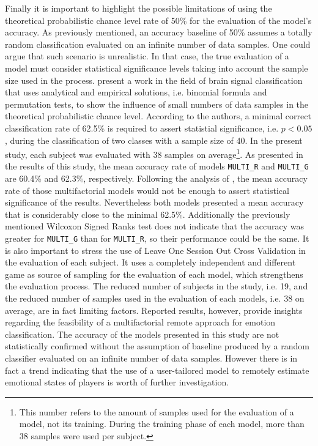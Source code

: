 Finally it is important to highlight the possible limitations of using the theoretical probabilistic chance level rate of 50\% for the evaluation of the model's accuracy. As previously mentioned, an accuracy baseline of 50\% assumes a totally random classification evaluated on an infinite number of data samples. One could argue that such scenario is unrealistic. In that case, the true evaluation of a model must consider statistical significance levels taking into account the sample size used in the process. \textcite{combrisson2015exceeding} present a work in the field of brain signal classification that uses analytical and empirical solutions, i.e. binomial formula and permutation tests, to show the influence of small numbers of data samples in the theoretical probabilistic chance level. According to the authors, a minimal correct classification rate of 62.5\% is required to assert statistial significance, i.e. $p < 0.05$, during the classification of two classes with a sample size of 40. In the present study, each subject was evaluated with 38 samples on average\footnote{This number refers to the amount of samples used for the evaluation of a model, not its training. During the training phase of each model, more than 38 samples were used per subject.}. As presented in the results of this study, the mean accuracy rate of models \texttt{MULTI\_R} and \texttt{MULTI\_G} are 60.4\% and 62.3\%, respectively. Following the analysis of \textcite{combrisson2015exceeding}, the mean accuracy rate of those multifactorial models would not be enough to assert statistical significance of the results. Nevertheless both models presented a mean accuracy that is considerably close to the minimal 62.5\%. Additionally the previously mentioned Wilcoxon Signed Ranks test does not indicate that the accuracy was greater for \texttt{MULTI\_G} than for \texttt{MULTI\_R}, so their performance could be the same. It is also important to stress the use of Leave One Session Out Cross Validation in the evaluation of each subject. It uses a completely independent and different game as source of sampling for the evaluation of each model, which strengthens the evaluation process. The reduced number of subjects in the study, i.e. 19, and the reduced number of samples used in the evaluation of each models, i.e. 38 on average, are in fact limiting factors. Reported results, however, provide insights regarding the feasibility of a multifactorial remote approach for emotion classification. The accuracy of the models presented in this study are not statistically confirmed without the assumption of baseline produced by a random classifier evaluated on an infinite number of data samples. However there is in fact a trend indicating that the use of a user-tailored model to remotely estimate emotional states of players is worth of further investigation.

